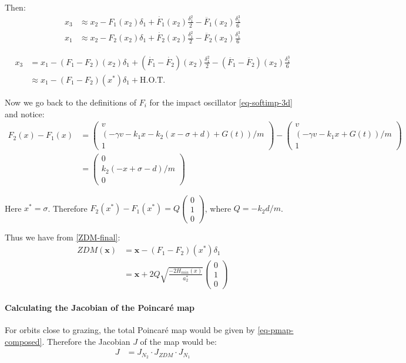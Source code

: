 \documentclass{book}
\renewcommand{\(}{\begin{columns}}
\renewcommand{\)}{\end{columns}}
\newcommand{\<}[1]{\begin{column}{#1}}
\renewcommand{\>}{\end{column}}
\newcommand{\colvt}[3]{\begin{pmatrix}#1\\#2\\#3\end{pmatrix}}
\newcommand{\bb}[1]{\textbf{#1}}
\newcommand{\para}{\paragraph}
\begin{document}
Then:
\begin{align}
\label{final}
x_3&\approx x_2-F_1(x_2)\delta_1+\dot{F_1}(x_2)\frac{\delta_1^2}{2}-\ddot{F_1}(x_2)\frac{\delta_1^3}{6}\\
x_1&\approx x_2-F_2(x_2)\delta_1+\dot{F_2}(x_2)\frac{\delta_1^2}{2}-\ddot{F_2}(x_2)\frac{\delta_1^3}{6}
\end{align}

\begin{align}
\label{ZDM-final}
x_3&=x_1-(F_1-F_2)(x_2)\delta_1+(\dot{F_1}-\dot{F_2})(x_2)\frac{\delta_1^2}{2}-(\ddot{F_1}-\ddot{F_2})(x_2)\frac{\delta_1^3}{6}\\
&\approx x_1-(F_1-F_2)(x^*)\delta_1+\text{H.O.T.}
\end{align}

Now we go back to the definitions of $F_i$ for the impact oscillator 
\eqref{eq-softimp-3d} and notice:
\begin{align}
F_2(x)-F_1(x)
&=
\begin{pmatrix}
v\\
(-\gamma v-k_1x-k_2(x-\sigma+d)+G(t))/m\\
1
\end{pmatrix}
-
\begin{pmatrix}
v\\
(-\gamma v-k_1x+G(t))/m\\
1
\end{pmatrix}
\\
&=
\begin{pmatrix}
0\\
k_2(-x+\sigma-d)/m\\
0
\end{pmatrix}\end{align}

Here $x^*=\sigma$.  
Therefore $F_2(x^*)-F_1(x^*)=Q\colvt{0}{1}{0}$, where $Q=-k_2d/m$.  

Thus we have from \eqref{ZDM-final}:
\begin{align}
\label{eq-ZDM-soft}
ZDM(\bb{x})&=\bb{x}-(F_1-F_2)(x^*)\delta_1\\
&=\bb{x}+2Q\sqrt{\frac{-2H_{min}(x)}{a_2^*}}\colvt{0}{1}{0}
\end{align}


\para{Calculating the Jacobian of the Poincaré map}
For orbits close to grazing, the total Poincaré map would be given by 
\eqref{eq-pmap-composed}. Therefore the Jacobian $J$ of the map would be:
\begin{align}
\label{eq-jacob-composed}
{J}&={J_{N_2}}\cdot{J_{ZDM}}\cdot{J_{N_1}}
\end{align}
\end{document}
